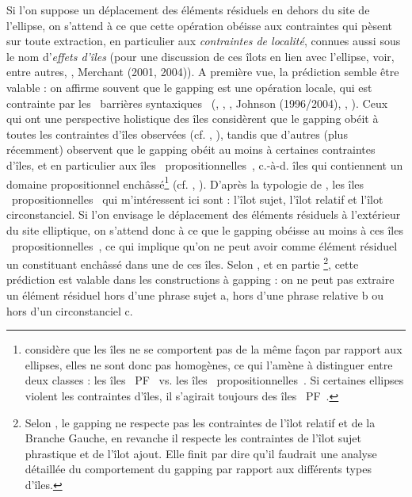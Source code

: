 Si l'on suppose un déplacement des éléments résiduels en dehors du site de l'ellipse, on s'attend à ce que cette opération obéisse aux contraintes qui pèsent sur toute extraction, en particulier aux \textit{contraintes de localité}, connues aussi sous le nom d'\textit{effets d'îles} (pour une discussion de ces îlots en lien avec l'ellipse, voir, entre autres, \citet{Ross1967}, Merchant (2001, 2004)). A première vue, la prédiction semble être valable : on affirme souvent que le gapping est une opération locale, qui est contrainte par les {\guillemotleft}~barrières syntaxiques~{\guillemotright} (\citet{Hankamer1973}, \citet{Neijt1979}, \citet{Chao1988}, Johnson (1996/2004), \citet{Coppock2001}, \citet{Winkler2005}). Ceux qui ont une perspective holistique des îles considèrent que le gapping obéit à toutes les contraintes d'îles observées (cf. \citet{Ross1967}, \citet{Neijt1979}), tandis que d'autres (plus récemment) observent que le gapping obéit au moins à certaines contraintes d'îles, et en particulier aux îles {\guillemotleft}~propositionnelles~{\guillemotright}, c.-à-d. îles qui contiennent un domaine propositionnel enchâssé\footnote{\citet{Merchant2001} considère que les îles ne se comportent pas de la même façon par rapport aux ellipses, elles ne sont donc pas homogènes, ce qui l'amène à distinguer entre deux classes : les îles {\guillemotleft}~PF~{\guillemotright} vs. les îles {\guillemotleft}~propositionnelles~{\guillemotright}. Si certaines ellipses violent les contraintes d'îles, il s'agirait toujours des îles {\guillemotleft}~PF~{\guillemotright}. }  (cf. \citet{Hartmann2000}, \citet{Coppock2001}). D'après la typologie de \citet{Merchant2001}, les îles {\guillemotleft}~propositionnelles~{\guillemotright} qui m'intéressent ici sont : l'îlot sujet, l'îlot relatif et l'îlot circonstanciel. Si l'on envisage le déplacement des éléments résiduels à l'extérieur du site elliptique, on s'attend donc à ce que le gapping obéisse au moins à ces îles {\guillemotleft}~propositionnelles~{\guillemotright}, ce qui implique qu'on ne peut avoir comme élément résiduel un constituant enchâssé dans une de ces îles. Selon \citet{Hartmann2000}, \citet{Coppock2001} et en partie \citet{Repp2009}\footnote{Selon \citet{Repp2009}, le gapping ne respecte pas les contraintes de l'îlot relatif et de la Branche Gauche, en revanche il respecte les contraintes de l'îlot sujet phrastique et de l'îlot ajout. Elle finit par dire qu'il faudrait une analyse détaillée du comportement du gapping par rapport aux différents types d'îles.}, cette prédiction est valable dans les constructions à gapping : on ne peut pas extraire un élément résiduel hors d'une phrase sujet a, hors d'une phrase relative b ou hors d'un circonstanciel c.


